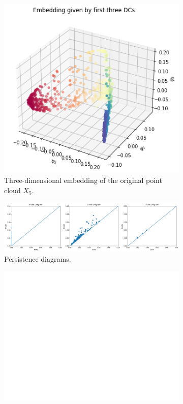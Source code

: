 \begin{figure}[H]
\centering
\begin{subfigure}[b]{0.2\textwidth}
    \includegraphics[width=\textwidth]{figures/topology/X5_embedding.png}
    \caption{Three-dimensional embedding of the original point cloud $X_5$.}
\end{subfigure}
\hfill
\begin{subfigure}[b]{0.75\textwidth}
    \includegraphics[width=\textwidth]{figures/topology/X5_H0.png}
    \caption{Persistence diagrams.}
\end{subfigure}
\begin{subfigure}[b]{0.25\textwidth}
\includegraphics[width=\textwidth]{figures/topology/white.png} 

\end{subfigure}
\end{figure}
